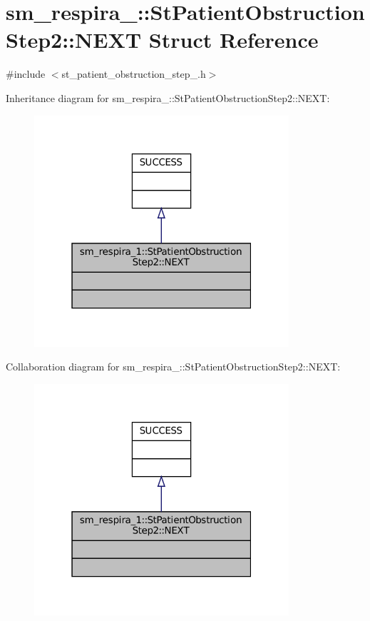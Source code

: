 \hypertarget{structsm__respira__1_1_1StPatientObstructionStep2_1_1NEXT}{}\section{sm\+\_\+respira\+\_\+:\+:St\+Patient\+Obstruction\+Step2\+:\+:N\+E\+XT Struct Reference}
\label{structsm__respira__1_1_1StPatientObstructionStep2_1_1NEXT}


{\ttfamily \#include $<$st\+\_\+patient\+\_\+obstruction\+\_\+step\+\_.\+h$>$}



Inheritance diagram for sm\+\_\+respira\+\_\+:\+:St\+Patient\+Obstruction\+Step2\+:\+:N\+E\+XT\+:
\nopagebreak
\begin{figure}[H]
\begin{center}
\leavevmode
\includegraphics[width=268pt]{structsm__respira__1_1_1StPatientObstructionStep2_1_1NEXT__inherit__graph}
\end{center}
\end{figure}


Collaboration diagram for sm\+\_\+respira\+\_\+:\+:St\+Patient\+Obstruction\+Step2\+:\+:N\+E\+XT\+:
\nopagebreak
\begin{figure}[H]
\begin{center}
\leavevmode
\includegraphics[width=268pt]{structsm__respira__1_1_1StPatientObstructionStep2_1_1NEXT__coll__graph}
\end{center}
\end{figure}


